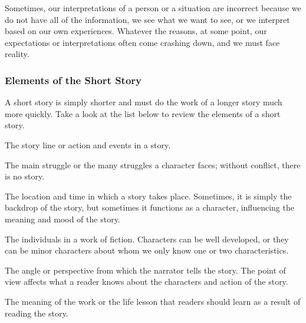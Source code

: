 
Sometimes, our interpretations of a person or a situation are incorrect because
we do not have all of the information, we see what we want to see, or we
interpret based on our own experiences. Whatever the reasons, at some point,
our expectations or interpretations often come crashing down, and we must face
reality.

\subsubsection*{Elements of the Short Story}

A short story is simply shorter and must do the work of a longer story much
more quickly. Take a look at the list below to review the elements of a short
story.

\begin{definition}[Plot]
    The story line or action and events in a story.
\end{definition}

\begin{definition}[Conflict]
    The main struggle or the many struggles a character faces; without
    conflict, there is no story.
\end{definition}

\begin{definition}[Setting]
    The location and time in which a story takes place. Sometimes, it is simply
    the backdrop of the story, but sometimes it functions as a
    character, influencing the meaning and mood of the story.
\end{definition}

\begin{definition}[Character]
    The individuals in a work of fiction. Characters can be well developed, or
    they can be minor characters about whom we only know one or
    two characteristics.
\end{definition}

\begin{definition}
    The angle or perspective from which the narrator tells the story. The point
    of view affects what a reader knows about the characters and
    action of the story.
\end{definition}

\begin{definition}[Theme]
    The meaning of the work or the life lesson that readers should learn as a
    result of reading the story.
\end{definition}

